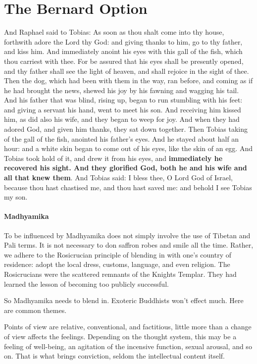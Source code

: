 \section{The Bernard Option}

\begin{quotex}
And Raphael said to Tobias: As soon as thou shalt come into thy house, forthwith adore the Lord thy God: and giving thanks to him, go to thy father, and kiss him. And immediately anoint his eyes with this gall of the fish, which thou carriest with thee. For be assured that his eyes shall be presently opened, and thy father shall see the light of heaven, and shall rejoice in the sight of thee. Then the dog, which had been with them in the way, ran before, and coming as if he had brought the news, shewed his joy by his fawning and wagging his tail. And his father that was blind, rising up, began to run stumbling with his feet: and giving a servant his hand, went to meet his son. And receiving him kissed him, as did also his wife, and they began to weep for joy. And when they had adored God, and given him thanks, they sat down together. Then Tobias taking of the gall of the fish, anointed his father's eyes. And he stayed about half an hour: and a white skin began to come out of his eyes, like the skin of an egg. And Tobias took hold of it, and drew it from his eyes, and \textbf{immediately he recovered his sight. And they glorified God, both he and his wife and all that knew them}. And Tobias said: I bless thee, O Lord God of Israel, because thou hast chastised me, and thou hast saved me: and behold I see Tobias my son.

\end{quotex}
\paragraph{Madhyamika}
To be influenced by Madhyamika does not simply involve the use of Tibetan and Pali terms. It is not necessary to don saffron robes and smile all the time. Rather, we adhere to the Rosicrucian principle of blending in with one's country of residence: adopt the local dress, customs, language, and even religion. The Rosicrucians were the scattered remnants of the Knights Templar. They had learned the lesson of becoming too publicly successful.

So Madhyamika needs to blend in. Exoteric Buddhists won't effect much. Here are common themes.

Points of view are relative, conventional, and factitious, little more than a change of view affects the feelings. Depending on the thought system, this may be a feeling of well-being, an agitation of the incensive function, sexual arousal, and so on. That is what brings conviction, seldom the intellectual content itself.

